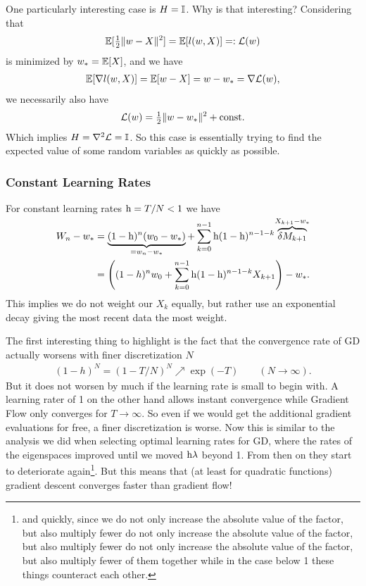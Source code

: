 One particularly interesting case is \(H=\mathbb{I}\). Why is that interesting?
Considering that
\begin{align*}
	\mathbb{E}[\tfrac12\|w-X\|^2]=\mathbb{E}[l(w,X)]=:\mathcal{L}(w)
\end{align*}
is minimized by \(w_*=\mathbb{E}[X]\), and we have
\begin{align*}
	\mathbb{E}[\nabla l(w,X)]
	=\mathbb{E}[w-X]=w- w_*=\nabla\mathcal{L}(w),
\end{align*}
we necessarily also have
\begin{align*}
	\mathcal{L}(w) = \tfrac12\|w-w_*\|^2 + \text{const}.
\end{align*}
Which implies \(H=\nabla^2\mathcal{L}=\mathbb{I}\). So this case is essentially
trying to find the expected value of some random variables as quickly as
possible.

\subsubsection{Constant Learning Rates}

For constant learning rates \(\text{h}=T/N<1\) we have
\begin{align*}
	W_n - w_*
	&= \underbrace{(1-\text{h})^n(w_0 -w_*)}_{=w_n-w_*}
	+ \sum_{k=0}^{n-1}\text{h}(1-\text{h})^{n-1-k}
	\smash{\overbrace{\delta M_{k+1}}^{X_{k+1}-w_*}}\\
	&= \left((1-h)^nw_0 + \sum_{k=0}^{n-1}\text{h}(1-\text{h})^{n-1-k}X_{k+1}\right)-w_*.
\end{align*}
This implies we do not weight our \(X_k\) equally, but rather use an
exponential decay giving the most recent data the most weight.

The first interesting thing to highlight is the fact that the convergence
rate of GD actually worsens with finer discretization \(N\)
\begin{align*}
	(1-h)^N = (1-T/N)^N \nearrow \exp(-T) \qquad (N\to\infty).
\end{align*}
But it does not worsen by much if the learning rate is small to begin with. A
learning rater of 1 on the other hand allows instant convergence while Gradient
Flow only converges for \(T\to\infty\). So even if we would get the additional
gradient evaluations for free, a finer discretization is worse. Now this is
similar to the analysis we did when selecting optimal learning rates for GD,
where the rates of the eigenspaces improved until we moved \(\text{h}\lambda\)
beyond 1. From then on they start to deteriorate again\footnote{
	and quickly, since we
	do not only increase the absolute value of the factor, but also multiply fewer 
do not only increase the absolute value of the factor, but also multiply fewer 
	do not only increase the absolute value of the factor, but also multiply fewer 
	of them together while in the case below 1 these things counteract each other.
}.
But this means that (at least for quadratic functions) gradient descent
converges faster than gradient flow!

